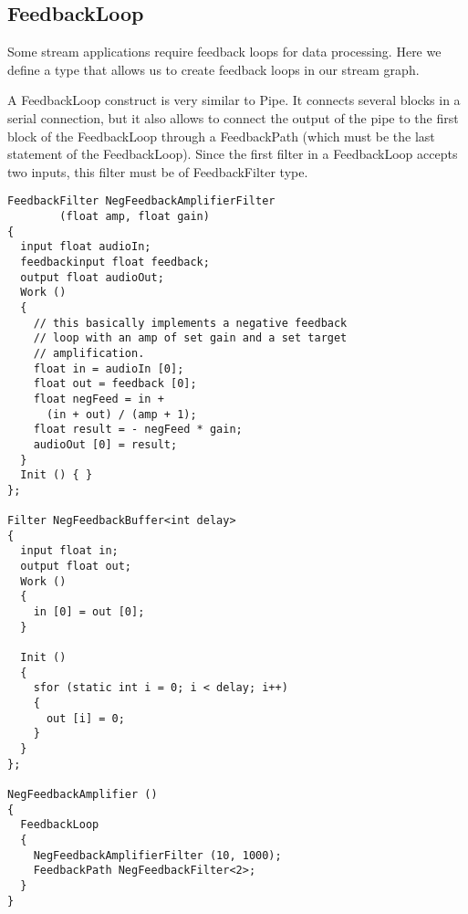 \documentclass[twocolumn, draft]{article}
\begin{document}
\subsection{FeedbackLoop}

Some stream applications require feedback loops for data processing.
Here we define a type that allows us to create feedback loops
in our stream graph.

A FeedbackLoop construct is very similar to Pipe.  It connects
several blocks in a serial connection, but it also allows to connect
the output of the pipe to the first block of the FeedbackLoop through
a FeedbackPath (which must be the last statement of the FeedbackLoop).
Since the first filter in a FeedbackLoop accepts
two inputs, this filter must be of FeedbackFilter type.

\begin{verbatim}
FeedbackFilter NegFeedbackAmplifierFilter
        (float amp, float gain)
{
  input float audioIn;
  feedbackinput float feedback;
  output float audioOut;
  Work ()
  {
    // this basically implements a negative feedback
    // loop with an amp of set gain and a set target
    // amplification.
    float in = audioIn [0];
    float out = feedback [0];
    float negFeed = in + 
      (in + out) / (amp + 1);
    float result = - negFeed * gain;
    audioOut [0] = result;
  }
  Init () { }
};

Filter NegFeedbackBuffer<int delay>
{
  input float in;
  output float out;
  Work ()
  {
    in [0] = out [0];
  }

  Init ()
  {
    sfor (static int i = 0; i < delay; i++)
    {
      out [i] = 0;
    }
  }
};

NegFeedbackAmplifier ()
{
  FeedbackLoop
  {
    NegFeedbackAmplifierFilter (10, 1000);
    FeedbackPath NegFeedbackFilter<2>;
  }
}
\end{verbatim}

\begin{comment}

\end{comment}

\begin{comment}

\begin{figure}[t]
\centerline{\psfig{figure=block.ps}}
\vspace{-24pt}
\caption{\protect\small The block construct.}
\end{figure}

\section{old stuff}

\begin{lgrind}

\end{lgrind}

\end{comment}
\end{document}
